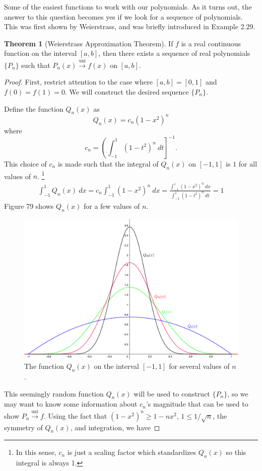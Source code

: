 \documentclass{article}
\newcommand{\uni}{\overset{\text{uni}}{\to}}
\theoremstyle{definition}
\newtheorem{theorem}{Theorem}[section]
\begin{document}
	Some of the easiest functions to work with our polynomials. As it turns out, the answer to this question becomes yes if we look for a sequence of polynomials. This was first shown by Weierstrass, and was briefly introduced in Example 2.29. 
	\begin{theorem}[Weierstrass Approximation Theorem]
		If $ f $ is a real continuous function on the interval $ [a,b] $, then there exists a sequence of real polynomials $ \{P_n\} $ such that $ P_n(x)\uni f(x) $ on $ [a,b] $. 
	\end{theorem}
	\begin{proof}
		First, restrict attention to the case where $ [a,b]=[0,1] $ and $ f(0)=f(1)=0 $. We will construct the desired sequence $ \{P_n\} $. 
		
		Define the function $ Q_n(x) $ as $$Q_n(x)=c_n(1-x^2)^n $$ where $$ c_n=\left(\int_{-1}^{1} (1-t^2)^n\ dt\right]^{-1}.$$ This choice of $ c_n $ is made such that the integral of $ Q_n(x) $ on $ [-1,1] $ is $ 1 $ for all values of $ n $. \footnote{In this sense, $ c_n $ is just a scaling factor which standardizes $ Q_n(x) $ so this integral is always 1.}
		\begin{align}
			\int_{-1}^{1}Q_n(x)\ dx=c_n\int_{-1}^{1}(1-x^2)^n\ dx=\frac{\int_{-1}^{1} (1-x^2)^n\ dx}{\int_{-1}^{1} (1-t^2)^n\ dt}=1
		\end{align}
		Figure 79 shows $ Q_n(x) $ for a few values of $ n $. 
		\begin{figure}[h!]
			\centering
			\includegraphics[width=0.9\linewidth]{figures/landau_kern}
			\caption{The function $ Q_n(x) $ on the interval $ [-1,1] $ for several values of $ n $.}
			\label{fig:landaukern}
		\end{figure}
		This seemingly random function $ Q_n(x) $ will be used to construct $ \{P_n\} $, so we may want to know some information about $c_n$'s magnitude that can be used to show $ P_n\uni f $. Using the fact that $ (1-x^2)^n\ge1-nx^2 $, $ 1\le 1/\sqrt{n} $, the symmetry of $ Q_n(x) $, and integration, we have 

\end{proof}
\end{document}
